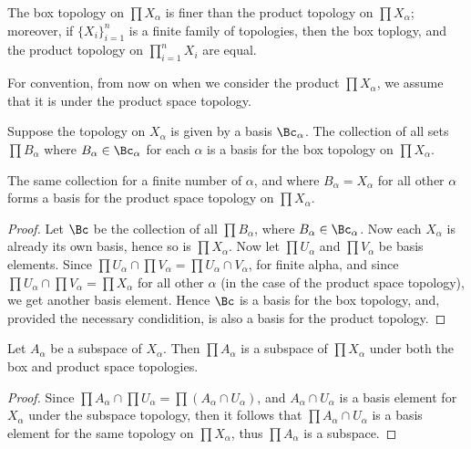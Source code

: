 \begin{corollary}
    The box topology on $\prod{X_{\alpha}}$ is finer than the product topology on
    $\prod{X_{\alpha}}$; moreover, if $\{X_{i}\}_{i=1}^{n}$ is a finite  family of topologies, then
    the box toplogy, and the product topology on $\prod_{i=1}^{n}{X_i}$ are equal.
\end{corollary}

For convention, from now on when we consider the product $\prod{X_{\alpha}}$, we assume that it is
under the product space topology.

\begin{theorem}\label{2.1.4}
    Suppose the topology on $X_{\alpha}$ is given by a basis $\Bc_{\alpha}$. The collection of all
    sets $\prod{B_{\alpha}}$ where $B_{\alpha} \in \Bc_{\alpha}$ for each $\alpha$ is a basis for
    the box topology on  $\prod{X_{\alpha}}$.

    The same collection for a finite number of $\alpha$, and where  $B_{\alpha}=X_{\alpha}$ for all
    other $\alpha$ forms a basis for the product space topology on  $\prod{X_{\alpha}}$.
\end{theorem}
\begin{proof}
    Let $\Bc$ be the collection of all  $\prod{B_{\alpha}}$, where $B_{\alpha} \in \Bc_{\alpha}$.
    Now each $X_{\alpha}$ is already its own basis, hence so is $\prod{X_{\alpha}}$. Now let
    $\prod{U_{\alpha}}$ and $\prod{V_{\alpha}}$ be basis elements. Since $\prod{U_{\alpha}} \cap
    \prod{V_{\alpha}}=\prod{U_{\alpha} \cap V_{\alpha}}$, for finite alpha, and since
    $\prod{U_{\alpha}} \cap \prod{V_{\alpha}}=\prod{X_{\alpha}}$ for all other $\alpha$  (in the
    case of the product space topology), we get another basis element. Hence $\Bc$ is a basis for
    the box topology, and, provided the necessary condidition, is also a basis for the product
    topology.
\end{proof}

\begin{theorem}\label{2.1.5}
    Let $A_{\alpha}$ be a subspace of $X_{\alpha}$. Then $\prod{A_{\alpha}}$ is a subspace of
    $\prod{X_{\alpha}}$ under both the box and product space topologies.
\end{theorem}
\begin{proof}
   Since $\prod{A_{\alpha}} \cap \prod{U_{\alpha}}=\prod{(A_{\alpha} \cap
   U_{\alpha})}$, and $A_{\alpha}
   \cap U_{\alpha}$ is a basis element for $X_ {\alpha}$ under the subspace topology, then it follows that
   $\prod{A_{\alpha} \cap U_{\alpha}}$ is a basis element for the same topology on
   $\prod{X_{\alpha}}$, thus $\prod{A_\alpha}$ is a subspace.
\end{proof}

